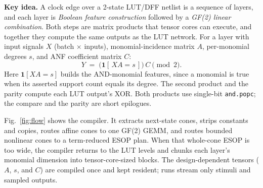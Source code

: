 \documentclass[sigconf]{acmart}
\newcommand{\mmapopc}{\texttt{and.popc}}
\begin{document}
\textbf{Key idea.} A clock edge over a 2-state LUT/DFF netlist is a sequence of layers, and each
layer is \emph{Boolean feature construction} followed by a \emph{GF(2) linear combination}. Both steps
are matrix products that tensor cores can execute, and together they compute the same outputs as
the LUT network. For a layer with
input signals $X$ (batch $\times$ inputs), monomial-incidence matrix $A$, per-monomial
degrees $s$, and ANF coefficient matrix $C$:
\begin{equation}
Y \;=\; \bigl(\mathbf{1}[\,X A = s\,]\bigr)\, C \pmod 2 .
\label{eq:anf}
\end{equation}
Here $\mathbf{1}[XA=s]$ builds the AND-monomial features, since a monomial is true when its
asserted support count equals its degree. The second product and the parity compute each LUT
output's XOR. Both products use single-bit \mmapopc{}; the compare and the parity are short
epilogues.

Fig.~\ref{fig:flow} shows the compiler. It extracts next-state cones, strips constants and copies,
routes affine cones to one GF(2) GEMM, and routes bounded nonlinear cones to a term-reduced ESOP
plan. When that whole-cone ESOP is too wide, the compiler returns to the LUT levels and chunks each
layer's monomial dimension into tensor-core-sized blocks. The design-dependent tensors ($A$, $s$,
and $C$) are compiled once and kept resident; runs stream only stimuli and sampled outputs.
\end{document}
